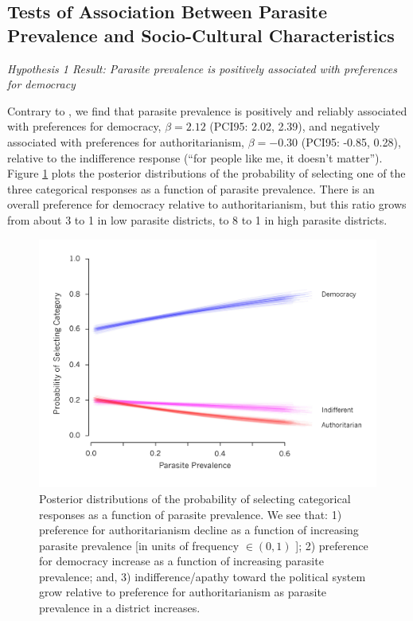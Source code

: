 \documentclass[12pt]{article}
\begin{document}
\subsection{Tests of Association Between Parasite Prevalence and Socio-Cultural Characteristics}
\noindent\textit{Hypothesis 1 Result:  Parasite prevalence is positively associated with preferences for democracy}

	Contrary to \citet{Thornhill2009}, we find that parasite prevalence is positively and reliably associated with preferences for democracy, $\beta=2.12$ (PCI95: 2.02, 2.39), and negatively associated with preferences for authoritarianism, $\beta=-0.30
$ (PCI95: -0.85, 0.28), relative to the indifference  response (``for people like me, it doesn't matter'').  Figure \ref{resDem} plots the posterior distributions of the probability of selecting one of the three categorical responses as a function of parasite prevalence. There is an overall preference for democracy relative to authoritarianism, but this ratio grows from about 3 to 1 in low parasite districts, to 8 to 1 in high parasite districts.   
 \begin{figure}
\caption{\label{resDem}  Posterior distributions of the probability of selecting categorical responses as a function of parasite prevalence.  We see that: 1) preference for authoritarianism decline as a function of increasing parasite prevalence [in units of frequency $\in (0,1)$ ]; 2) preference for democracy increase as a function of increasing parasite prevalence; and, 3) indifference/apathy toward the political system grow relative to preference for authoritarianism as parasite prevalence in a district increases.  }
\includegraphics[width=5in]{Figures/DemocracyModel} 
\end{figure}
\end{document}
